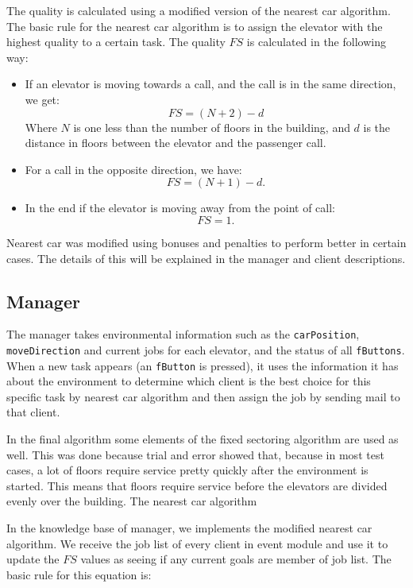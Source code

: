 \documentclass[a4paper,10pt,twocolumn]{article}
\begin{document}
The quality is calculated using a modified version of the nearest car algorithm. The basic rule for the nearest car algorithm is to assign the elevator with the highest quality to a certain task. The quality $FS$ is calculated in the following way:
\begin{itemize}
 \item If an elevator is moving towards a call, and the call is in the same direction, we get:
\begin{equation}
 FS = (N + 2) - d
\end{equation}
 Where $N$ is one less than the number of floors in the building, and $d$ is the distance in floors between the elevator and the passenger call.
 \item For a call in the opposite direction, we have:
\begin{equation}
 FS = (N + 1) - d.
\end{equation}
 \item In the end if the elevator is moving away from the point of call: 
 \begin{equation}
  FS = 1.
 \end{equation}
\end{itemize}
Nearest car was modified using bonuses and penalties to perform better in certain cases. The details of this will be explained in the manager and client descriptions.


\subsection{Manager}
The manager takes environmental information such as the \texttt{carPosition}, \texttt{moveDirection} and current jobs for each elevator, and the status of all \texttt{fButtons}. When a new task appears (an \texttt{fButton} is pressed), it uses the information it has about the environment to determine which client is the best choice for this specific task by nearest car algorithm and then assign the job by sending mail to that client.

In the final algorithm some elements of the fixed sectoring algorithm are used as well. This was done because trial and error showed that, because in most test cases, a lot of floors require service pretty quickly after the environment is started. This means that floors require service before the elevators are divided evenly over the building. The nearest car algorithm 

In the knowledge base of manager, we implements the modified nearest car algorithm. We receive the job list of every client in event module and use it to update the $FS$ values as seeing if any current goals are member of job list. The basic rule for this equation is:
\end{document}
